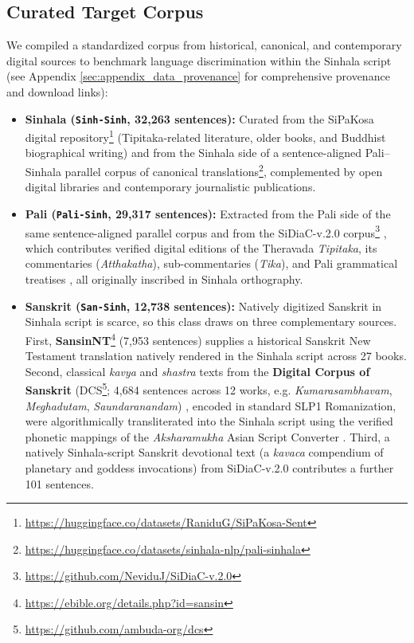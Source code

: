 \documentclass[11pt]{article}
\begin{document}
\subsection{Curated Target Corpus}
\label{sec:curated_target_corpus}
We compiled a standardized corpus from historical, canonical, and contemporary digital sources to benchmark language discrimination within the Sinhala script (see Appendix \ref{sec:appendix_data_provenance} for comprehensive provenance and download links):
\begin{itemize}
    \item \textbf{Sinhala (\texttt{Sinh-Sinh}, 32,263 sentences):} Curated from the SiPaKosa digital repository\footnote{\url{https://huggingface.co/datasets/RaniduG/SiPaKosa-Sent}} (Tipitaka-related literature, older books, and Buddhist biographical writing) and from the Sinhala side of a sentence-aligned Pali--Sinhala parallel corpus of canonical translations\footnote{\url{https://huggingface.co/datasets/sinhala-nlp/pali-sinhala}}, complemented by open digital libraries and contemporary journalistic publications.
    \item \textbf{Pali (\texttt{Pali-Sinh}, 29,317 sentences):} Extracted from the Pali side of the same sentence-aligned parallel corpus and from the SiDiaC-v.2.0 corpus\footnote{\url{https://github.com/NeviduJ/SiDiaC-v.2.0}} \cite{welgama2021sidiac}, which contributes verified digital editions of the Theravada \textit{Tipitaka}, its commentaries (\textit{Atthakatha}), sub-commentaries (\textit{Tika}), and Pali grammatical treatises \cite{norman1983pali}, all originally inscribed in Sinhala orthography.
    \item \textbf{Sanskrit (\texttt{San-Sinh}, 12,738 sentences):} Natively digitized Sanskrit in Sinhala script is scarce, so this class draws on three complementary sources. First, \textbf{SansinNT}\footnote{\url{https://ebible.org/details.php?id=sansin}} (7,953 sentences) supplies a historical Sanskrit New Testament translation natively rendered in the Sinhala script across 27 books. Second, classical \textit{kavya} and \textit{shastra} texts from the \textbf{Digital Corpus of Sanskrit} (DCS\footnote{\url{https://github.com/ambuda-org/dcs}}; 4,684 sentences across 12 works, e.g. \textit{Kumarasambhavam}, \textit{Meghadutam}, \textit{Saundaranandam}) \cite{hellwig2010dcs}, encoded in standard SLP1 Romanization, were algorithmically transliterated into the Sinhala script using the verified phonetic mappings of the \textit{Aksharamukha} Asian Script Converter \cite{rajan2023aksharamukha}. Third, a natively Sinhala-script Sanskrit devotional text (a \textit{kavaca} compendium of planetary and goddess invocations) from SiDiaC-v.2.0 \cite{welgama2021sidiac} contributes a further 101 sentences.
\end{itemize}
\end{document}
